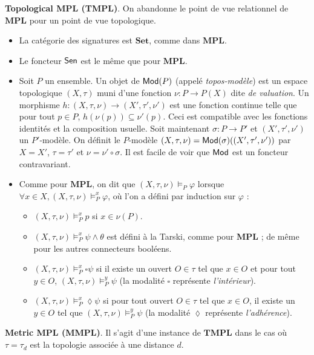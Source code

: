 \documentclass[11pt,a4paper]{article}
\newcommand{\ph}{\varphi}
\newcommand{\itemz}{\item[$\triangleright$]}
\newcommand{\gr}{\textbf}
\newcommand{\il}{\textit}
\newcommand{\info}[1]{\text{{\fontfamily{lmss}\selectfont #1}}}
\newcommand{\Mod}{\info{Mod}}
\newcommand{\Sen}{\info{Sen}}
\newcommand{\1}{\mathbbm{1}}
\begin{document}
\gr{Topological MPL (TMPL)}. On abandonne le point de vue relationnel de $\gr{MPL}$ pour un point de vue topologique.
\begin{itemize}
\itemz La catégorie des signatures est $\gr{Set}$, comme dans $\gr{MPL}$.
\itemz Le foncteur $\Sen$ est le même que pour $\gr{MPL}$.
\itemz Soit $P$ un ensemble. Un objet de $\Mod(P)$ (appelé \il{topos-modèle}) est un espace topologique $(X,\tau)$ muni d'une fonction $\nu : P \to P(X)$ dite \il{de valuation}. Un morphisme $h : (X,\tau,\nu) \to (X',\tau',\nu')$ est une fonction continue telle que pour tout $p \in P$, $h(\nu(p)) \subseteq \nu'(p)$. Ceci est compatible avec les fonctions identités et la composition usuelle. Soit maintenant $\sigma : P \to P'$ et $(X',\tau',\nu')$ un $P'$-modèle. On définit le $P$-modèle $(X,\tau,\nu) = \Mod(\sigma)((X',\tau',\nu'))$ par $X = X'$, $\tau = \tau'$ et $\nu = \nu' \circ \sigma$. Il est facile de voir que $\Mod$ est un foncteur contravariant.
\itemz Comme pour $\gr{MPL}$, on dit que $(X,\tau,\nu) \models_P \ph$ lorsque $\forall x \in X, (X,\tau,\nu) \models_P^x \ph$, où l'on a défini par induction sur $\ph$ :
\begin{itemize}
\setlength\itemsep{-0.3em}
\item $(X,\tau,\nu) \models_P^x p$ si $x \in \nu(P)$.
\item $(X,\tau,\nu) \models_P^x \psi \wedge \theta$ est défini à la Tarski, comme pour $\gr{MPL}$ ; de même pour les autres connecteurs booléens.
\item $(X,\tau,\nu) \models_P^x \square \psi$ si il existe un ouvert $O \in \tau$ tel que $x \in O$ et pour tout $y \in O$, $(X,\tau,\nu) \models_P^y \psi$ (la modalité $\square$ représente \il{l'intérieur}).
\item $(X,\tau,\nu) \models_P^x \lozenge \psi$ si pour tout ouvert $O \in \tau$ tel que $x \in O$, il existe un $y \in O$ tel que $(X,\tau,\nu) \models_P^y \psi$ (la modalité $\lozenge$ représente \il{l'adhérence}).
\end{itemize}
\end{itemize}
\gr{Metric MPL (MMPL)}. Il s'agit d'une instance de $\gr{TMPL}$ dans le cas où $\tau = \tau_d$ est la topologie associée à une distance $d$.
\end{document}
